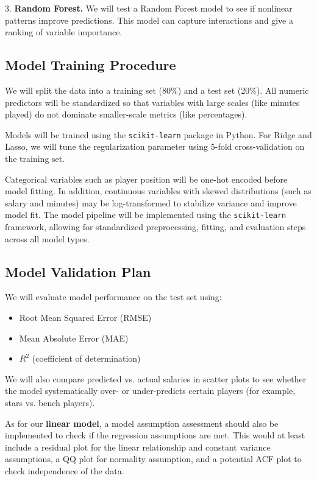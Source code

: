 \documentclass{article}
\theoremstyle{plain}
\theoremstyle{definition}
\theoremstyle{remark}
\begin{document}
3. \textbf{Random Forest.}  
We will test a Random Forest model to see if nonlinear patterns improve predictions. This model can capture interactions and give a ranking of variable importance.

\subsection*{Model Training Procedure}

We will split the data into a training set (80\%) and a test set (20\%).  
All numeric predictors will be standardized so that variables with large scales (like minutes played) do not dominate smaller-scale metrics (like percentages).

Models will be trained using the \texttt{scikit-learn} package in Python. 
For Ridge and Lasso, we will tune the regularization parameter using 5-fold cross-validation on the training set.

Categorical variables such as player position will be one-hot encoded before model fitting. In addition, continuous variables with skewed distributions (such as salary and minutes) may be log-transformed to stabilize variance and improve model fit. The model pipeline will be implemented using the \texttt{scikit-learn} framework, allowing for standardized preprocessing, fitting, and evaluation steps across all model types.


\subsection*{Model Validation Plan}

We will evaluate model performance on the test set using:
\begin{itemize}
    \item Root Mean Squared Error (RMSE)
    \item Mean Absolute Error (MAE)
    \item $R^2$ (coefficient of determination)
\end{itemize}

We will also compare predicted vs. actual salaries in scatter plots to see whether the model systematically over- or under-predicts certain players (for example, stars vs. bench players).

As for our \textbf{linear model}, a model assumption assessment should also be implemented to check if the regression assumptions are met. This would at least include a residual plot for the linear relationship and constant variance assumptions, a QQ plot for normality assumption, and a potential ACF plot to check independence of the data.  
\end{document}
